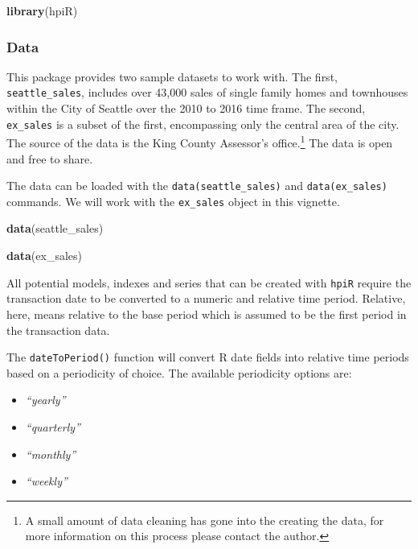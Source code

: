 \documentclass[]{article}
\newenvironment{Shaded}{\begin{snugshade}}{\end{snugshade}}
\newcommand{\KeywordTok}[1]{\textcolor[rgb]{0.13,0.29,0.53}{\textbf{#1}}}
\newcommand{\NormalTok}[1]{#1}
\providecommand{\tightlist}{%
  \setlength{\itemsep}{0pt}\setlength{\parskip}{0pt}}
\let\rmarkdownfootnote\footnote%
\def\footnote{\protect\rmarkdownfootnote}
\begin{document}
\begin{Shaded}
\begin{Highlighting}[]
  \KeywordTok{library}\NormalTok{(hpiR)}
\end{Highlighting}
\end{Shaded}

\hypertarget{data}{%
\subsubsection{Data}\label{data}}

This package provides two sample datasets to work with. The first,
\texttt{seattle\_sales}, includes over 43,000 sales of single family
homes and townhouses within the City of Seattle over the 2010 to 2016
time frame. The second, \texttt{ex\_sales} is a subset of the first,
encompassing only the central area of the city. The source of the data
is the King County Assessor's office.\footnote{A small amount of data
  cleaning has gone into the creating the data, for more information on
  this process please contact the author.} The data is open and free to
share.

The data can be loaded with the \texttt{data(seattle\_sales)} and
\texttt{data(ex\_sales)} commands. We will work with the
\texttt{ex\_sales} object in this vignette.

\begin{Shaded}
\begin{Highlighting}[]
  \KeywordTok{data}\NormalTok{(seattle_sales)}

  \KeywordTok{data}\NormalTok{(ex_sales)}
\end{Highlighting}
\end{Shaded}

All potential models, indexes and series that can be created with
\texttt{hpiR} require the transaction date to be converted to a numeric
and relative time period. Relative, here, means relative to the base
period which is assumed to be the first period in the transaction data.

The \texttt{dateToPeriod()} function will convert R date fields into
relative time periods based on a periodicity of choice. The available
periodicity options are:

\begin{itemize}
\tightlist
\item
  \emph{``yearly''}
\item
  \emph{``quarterly''}
\item
  \emph{``monthly''}
\item
  \emph{``weekly''}
\end{itemize}
\end{document}
